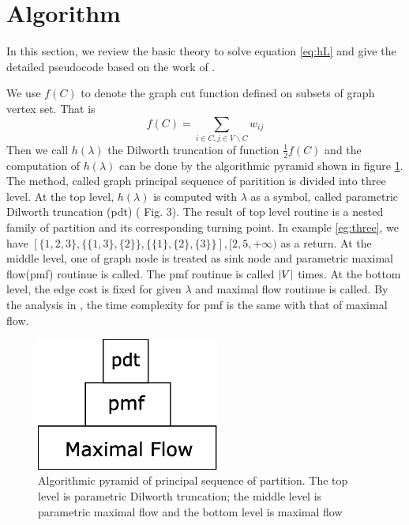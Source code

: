\documentclass{article}
\begin{document}
\section{Algorithm}\label{sec:algorithm}

In this section, we review the basic theory to solve equation \eqref{eq:hL} and give the detailed pseudocode based on the work of \cite{RN4}.

We use $f(C)$ to denote the graph cut function defined on subsets of graph vertex set. That is
\begin{equation}
f(C) =\sum_{ i\in C, j\in V\backslash C} w_{ij}
\end{equation}
Then we call $h(\lambda)$ the Dilworth truncation of function $ \frac{1}{2} f(C)$ and the computation of $h(\lambda)$ can be done by the algorithmic pyramid shown in figure \ref{fig:pyramid}. The method, called graph principal sequence of paritition is divided into three level. At the top level, $h(\lambda)$ is computed with $\lambda$ as a symbol, called parametric Dilworth truncation (pdt) (\cite{RN4} Fig. 3). The result of top level routine is a nested family of partition and its corresponding turning point. In example \ref{eg:three}, we have $[\{1,2,3\},\{\{1,3\},\{2\}\},\{\{1\},\{2\},\{3\}\}],[2,5,+\infty) $ as a return. At the middle level, one of graph node is treated as sink node and parametric maximal flow(pmf) routinue is called.
The pmf routinue is called $\lvert V\rvert$ times. At the bottom level, the edge cost is fixed for given $\lambda$ and maximal flow routinue is called. By the analysis in \cite{RN17}, the time complexity for pmf is the same with that of maximal flow.
\begin{figure}
\centering
\includegraphics[width=6cm]{pdt.eps}
\caption{Algorithmic pyramid of principal sequence of partition. The top level is parametric Dilworth truncation; the middle level is parametric maximal flow and the bottom level is maximal flow}\label{fig:pyramid}
\end{figure}
\end{document}
